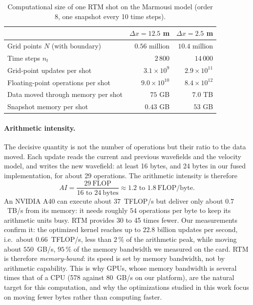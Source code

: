 \documentclass[letterpaper,11pt,leqno]{article}
\begin{document}
\begin{table}[htbp]
\centering
\caption{Computational size of one RTM shot on the Marmousi model (order 8,
one snapshot every 10 time steps).}
\label{tab:rtm-cost}
\begin{tabular}{lrr}
\toprule
                                   & $\Delta x = 12.5$ m & $\Delta x = 2.5$ m \\
\midrule
Grid points $N$ (with boundary)    & $0.56$ million      & $10.4$ million     \\
Time steps $n_t$                   & $2\,800$            & $14\,000$          \\
Grid-point updates per shot        & $3.1\times10^{9}$   & $2.9\times10^{11}$ \\
Floating-point operations per shot & $9.0\times10^{10}$  & $8.4\times10^{12}$ \\
Data moved through memory per shot & $75$ GB             & $7.0$ TB           \\
Snapshot memory per shot           & $0.43$ GB           & $53$ GB            \\
\bottomrule
\end{tabular}
\end{table}

\paragraph{Arithmetic intensity.}
The decisive quantity is not the number of operations but their ratio to the
data moved. Each update reads the current and previous wavefields and the
velocity model, and writes the new wavefield: at least 16 bytes, and 24 bytes in
our fused implementation, for about 29 operations. The arithmetic intensity is
therefore
\begin{equation}
  AI = \frac{29\ \text{FLOP}}{16\text{ to }24\ \text{bytes}}
     \approx 1.2\text{ to }1.8\ \text{FLOP/byte}.
\end{equation}
An NVIDIA A40 can execute about $37$~TFLOP/s but deliver only about $0.7$~TB/s
from its memory: it needs roughly $54$ operations per byte to keep its
arithmetic units busy. RTM provides 30 to 45 times fewer. Our
measurements confirm it: the optimized kernel reaches up to $22.8$ billion
updates per second, i.e.\ about $0.66$~TFLOP/s, less than $2\,\%$ of the
arithmetic peak, while moving about $550$~GB/s, $95\,\%$ of the memory bandwidth
we measured on the card. RTM is therefore \emph{memory-bound}: its speed is set
by memory bandwidth, not by arithmetic capability. This is why GPUs, whose memory
bandwidth is several times that of a CPU (578 against 80~GB/s on our platform),
are the natural target for this computation, and why the optimizations studied in this work focus on moving
fewer bytes rather than computing faster.
\end{document}
